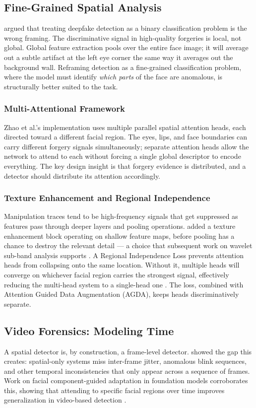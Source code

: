 \subsection{Fine-Grained Spatial Analysis}
\citet{Zhao2021MultiAttentional} argued that treating deepfake detection as a binary classification problem is the wrong framing. The discriminative signal in high-quality forgeries is local, not global. Global feature extraction pools over the entire face image; it will average out a subtle artifact at the left eye corner the same way it averages out the background wall. Reframing detection as a fine-grained classification problem, where the model must identify \textit{which parts} of the face are anomalous, is structurally better suited to the task.

\subsubsection{Multi-Attentional Framework}
Zhao et al.'s implementation uses multiple parallel spatial attention heads, each directed toward a different facial region. The eyes, lips, and face boundaries can carry different forgery signals simultaneously; separate attention heads allow the network to attend to each without forcing a single global descriptor to encode everything. The key design insight is that forgery evidence is distributed, and a detector should distribute its attention accordingly.

\subsubsection{Texture Enhancement and Regional Independence}
Manipulation traces tend to be high-frequency signals that get suppressed as features pass through deeper layers and pooling operations. \citet{Zhao2021MultiAttentional} added a texture enhancement block operating on shallow feature maps, before pooling has a chance to destroy the relevant detail — a choice that subsequent work on wavelet sub-band analysis supports \citep{Zhu2025WaveDIF, Li2024FrequencyAware}. A Regional Independence Loss prevents attention heads from collapsing onto the same location. Without it, multiple heads will converge on whichever facial region carries the strongest signal, effectively reducing the multi-head system to a single-head one \citep{pan25}. The loss, combined with Attention Guided Data Augmentation (AGDA), keeps heads discriminatively separate.

\subsection{Video Forensics: Modeling Time}
A spatial detector is, by construction, a frame-level detector. \citet{Jugade2026SpatialTemporal} showed the gap this creates: spatial-only systems miss inter-frame jitter, anomalous blink sequences, and other temporal inconsistencies that only appear across a sequence of frames. Work on facial component-guided adaptation in foundation models corroborates this, showing that attending to specific facial regions over time improves generalization in video-based detection \citep{Zhang2025FCG}.

